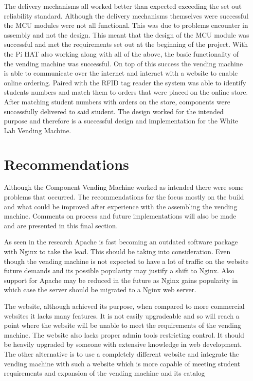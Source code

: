 \documentclass[a4paper,11pt]{article}
\numberwithin{figure}{section}
\numberwithin{table}{section}
\begin{document}
The delivery mechanisms all worked better than expected exceeding the set out reliability standard. Although the delivery mechanisms themselves were successful the MCU modules were not all functional. This was due to problems encounter in assembly and not the design. This meant that the design of the MCU module was successful and met the requirements set out at the beginning of the project. With the Pi HAT also working along with all of the above, the basic functionality of the vending machine was successful. On top of this success the vending machine is able to communicate over the internet and interact with a website to enable online ordering. Paired with the RFID tag reader the system was able to identify students numbers and match them to orders that were placed on the online store. After matching student numbers with orders on the store, components were successfully delivered to said student. The design worked for the intended purpose and therefore is a successful design and implementation for the White Lab Vending Machine.

\newpage

\section{Recommendations}\thispagestyle{sectionstart}
Although the Component Vending Machine worked as intended there were some problems that occurred. The recommendations for the focus mostly on the build and what could be improved after experience with the assembling the vending machine. Comments on process and future implementations will also be made and are presented in this final section.

As seen in the research Apache is fast becoming an outdated software package with Nginx to take the lead. This should be taking into consideration. Even though the vending machine is not expected to have a lot of traffic on the website future demands and its possible popularity may justify a shift to Nginx. Also support for Apache may be reduced in the future as Nginx gains popularity in which case the server should be migrated to a Nginx web server. 

The website, although achieved its purpose, when compared to more commercial websites it lacks many features. It is not easily upgradeable and so will reach a point where the website will be unable to meet the requirements of the vending machine. The website also lacks proper admin tools restricting control. It should be heavily upgraded by someone with extensive knowledge in web development. The other alternative is to use a completely different website and integrate the vending machine with such a website which is more capable of meeting student requirements and expansion of the vending machine and its catalog
\end{document}
